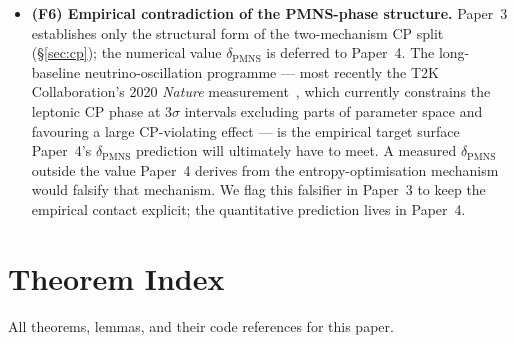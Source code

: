 \documentclass[11pt]{article}
\newenvironment{varlist}{\begin{itemize}[nosep,leftmargin=2em]}{\end{itemize}}
\begin{document}
\begin{varlist}
  \item \textbf{(F6) Empirical contradiction of the PMNS-phase
    structure.}  Paper~3 establishes only the structural form of the
    two-mechanism CP split (\S\ref{sec:cp}); the numerical value
    $\delta_{\mathrm{PMNS}}$ is deferred to Paper~4.  The long-baseline
    neutrino-oscillation programme --- most recently the T2K
    Collaboration's 2020 \emph{Nature}
    measurement~\cite{T2K2020}, which currently constrains the leptonic
    CP phase at $3\sigma$ intervals excluding parts of parameter space
    and favouring a large CP-violating effect --- is the empirical
    target surface Paper~4's $\delta_{\mathrm{PMNS}}$ prediction will
    ultimately have to meet.  A measured $\delta_{\mathrm{PMNS}}$ outside
    the value Paper~4 derives from the entropy-optimisation mechanism
    would falsify that mechanism.  We flag this falsifier in Paper~3
    to keep the empirical contact explicit; the quantitative prediction
    lives in Paper~4.
\end{varlist}


\appendix

\section{Theorem Index}
\label{sec:index}
\label{app:theorems}

All theorems, lemmas, and their code references for this paper.
\end{document}
